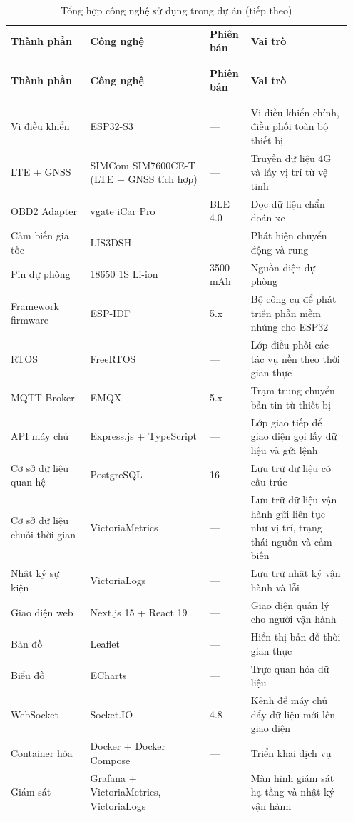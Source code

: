 \documentclass[a4paper]{extarticle}
\newcommand{\thesissettableid}[2]{%
  \renewcommand{\thetable}{#1}%
  \renewcommand{\theHtable}{#2}%
}
\begin{document}
{\thesissettableid{1.3}{tab-ch1-technology-stack-summary}
\def\LTcaptype{table}
\begin{longtable}{|L{0.223\linewidth}|L{0.334\linewidth}|L{0.115\linewidth}|L{0.282\linewidth}|}
\caption{Tổng hợp công nghệ sử dụng trong dự án}\label{tab:ch1-technology-stack-summary}\\
\hline \textbf{Thành phần} & \textbf{Công nghệ} & \textbf{Phiên bản} & \textbf{Vai trò} \\
\\\hline
\endfirsthead
\caption[]{Tổng hợp công nghệ sử dụng trong dự án (tiếp theo)}\\
\hline \textbf{Thành phần} & \textbf{Công nghệ} & \textbf{Phiên bản} & \textbf{Vai trò} \\
\\\hline
\endhead
\\\hline
\endfoot
\endlastfoot
Vi điều khiển & ESP32-S3 & --- & Vi điều khiển chính, điều phối toàn bộ
thiết bị \\\hline
LTE + GNSS & SIMCom SIM7600CE-T (LTE + GNSS tích hợp) & --- & Truyền dữ
liệu 4G và lấy vị trí từ vệ tinh \\\hline
OBD2 Adapter & vgate iCar Pro & BLE 4.0 & Đọc dữ liệu chẩn đoán xe \\\hline
Cảm biến gia tốc & LIS3DSH & --- & Phát hiện chuyển động và rung \\\hline
Pin dự phòng & 18650 1S Li-ion & 3500 mAh & Nguồn điện dự phòng \\\hline
Framework firmware & ESP-IDF & 5.x & Bộ công cụ để phát triển phần mềm
nhúng cho ESP32 \\\hline
RTOS & FreeRTOS & --- & Lớp điều phối các tác vụ nền theo thời gian thực \\\hline
MQTT Broker & EMQX & 5.x & Trạm trung chuyển bản tin từ thiết bị \\\hline
API máy chủ & Express.js + TypeScript & --- & Lớp giao tiếp để
giao diện gọi lấy dữ liệu và gửi lệnh \\\hline
Cơ sở dữ liệu quan hệ & PostgreSQL & 16 & Lưu trữ dữ liệu có cấu trúc \\\hline
Cơ sở dữ liệu chuỗi thời gian & VictoriaMetrics & --- & Lưu trữ
dữ liệu vận hành gửi liên tục như vị trí, trạng thái nguồn và cảm biến \\\hline
Nhật ký sự kiện & VictoriaLogs & --- & Lưu trữ nhật ký vận hành và lỗi \\\hline
Giao diện web & Next.js 15 + React 19 & --- & Giao diện quản lý cho
người vận hành \\\hline
Bản đồ & Leaflet & --- & Hiển thị bản đồ thời gian thực \\\hline
Biểu đồ & ECharts & --- & Trực quan hóa dữ liệu \\\hline
WebSocket & Socket.IO & 4.8 & Kênh để máy chủ đẩy dữ liệu mới lên giao
diện \\\hline
Container hóa & Docker + Docker Compose & --- & Triển khai dịch vụ \\\hline
Giám sát & Grafana + VictoriaMetrics, VictoriaLogs & --- & Màn hình giám
sát hạ tầng và nhật ký vận hành \\\hline
\end{longtable}
}
\end{document}
